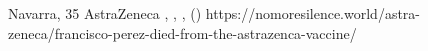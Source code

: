           {Navarra, }
          {35}
          {AstraZeneca}
          {}
          {
            ,
            ,
            ,
             ()
          }
          {https://nomoresilence.world/astra-zeneca/francisco-perez-died-from-the-astrazenca-vaccine/}


